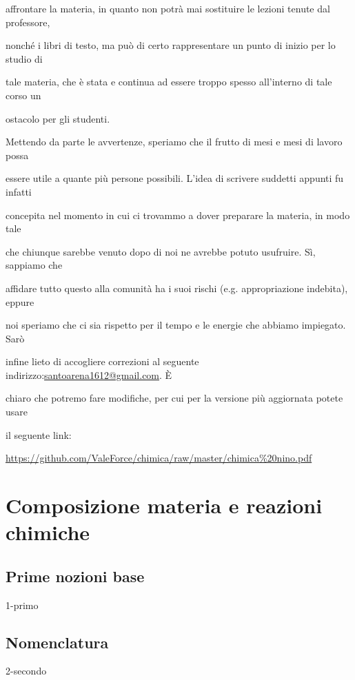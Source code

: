 \documentclass[openany,12pt]{book}%
\newcommand{\E}{È \hspace{0.1mm}}
\newcommand\blankpage{%
    \null
    \thispagestyle{empty}%
    \newpage}
\begin{document}
affrontare la materia, in quanto non potrà mai sostituire le lezioni tenute dal professore,

nonché i libri di testo, ma può di certo rappresentare un punto di inizio per lo studio di

tale materia, che è stata e continua ad essere troppo spesso all'interno di tale corso un

ostacolo per gli studenti.

\vspace{0.2cm}
Mettendo da parte le avvertenze, speriamo che il frutto di mesi e mesi di lavoro possa

essere utile a quante più persone possibili. L'idea di scrivere suddetti appunti fu infatti

concepita nel momento in cui ci trovammo a dover preparare la materia, in modo tale

che chiunque sarebbe venuto dopo di noi ne avrebbe potuto usufruire. Sì, sappiamo che

affidare tutto questo alla comunità ha i suoi rischi (e.g. appropriazione indebita), eppure

noi speriamo che ci sia rispetto per il tempo e le energie che abbiamo impiegato. Sarò

infine lieto di accogliere correzioni al seguente indirizzo:\hspace{0.15cm}\href{mailto:santoarena1612@gmail.com}{santoarena1612@gmail.com}. \E

chiaro che potremo fare modifiche, per cui per la versione più aggiornata potete usare

il seguente link:

\begin{center}
\url{https://github.com/ValeForce/chimica/raw/master/chimica%20nino.pdf}
\end{center}

\afterpage{\blankpage}
\newpage

\chapter{Composizione materia e reazioni chimiche}

  \section{Prime nozioni base}
    {1-primo}

    \newpage

  \section{Nomenclatura}
    {2-secondo}
\end{document}
